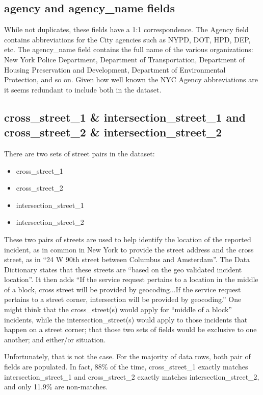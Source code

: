 \documentclass[12pt, titlepage]{article}
\begin{document}
 \subsection{agency and agency\_name fields}
 While not duplicates, these fields have a 1:1 correspondence.  The Agency field contains abbreviations for the City agencies such as NYPD, DOT, HPD, DEP, etc.
 The agency\_name field contains the full name of the various organizations: New York Police Department, Department of Transportation, Department
 of Housing Preservation and Development, Department of Environmental Protection, and so on.  Given how well known the NYC Agency abbreviations are
it seems redundant to include both in the dataset.

\subsection{cross\_street\_1 \& intersection\_street\_1 and cross\_street\_2 \& intersection\_street\_2}
There are two sets of street pairs in the dataset:

	\begin{itemize}
		\item cross\_street\_1
		\item cross\_street\_2
		\item intersection\_street\_1
		\item intersection\_street\_2
	\end{itemize}
	
These two pairs of streets are used to help identify the location of the reported incident, as in common in
New York to provide the street address and the cross street, as in ``24 W 90th street between Columbus and
Amsterdam''. The Data Dictionary states that these streets are
 ``based on the geo validated incident location''. It then adds ``If the service request 
pertains to a location in the middle of a block, cross street will be provided by geocoding...If the service request 
pertains to a street corner, intersection will be provided by geocoding.''  One might think that the
cross\_street(s) would apply for ``middle of a block'' incidents, while the intersection\_street(s) would
apply to those incidents that happen on a street corner; that those two sets of fields would be
exclusive to one another; and either/or situation. 

Unfortunately, that is not the case. For the majority of data rows, both pair of fields are populated.
In fact, 88\% of the time, cross\_street\_1 exactly matches intersection\_street\_1 and 
cross\_street\_2 exactly matches intersection\_street\_2, and only 11.9\% are non-matches.
\end{document}
